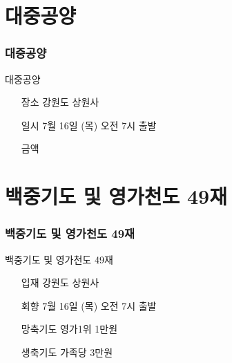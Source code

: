 \documentclass[aspectratio=1610,12pt,xcolor=pdftex,dvipsnames,table,handout]{beamer}
\begin{document}
	

	

		\section{대중공양}
		\begin{frame} [t,plain]
		\frametitle{대중공양}
			\begin{block} {대중공양 }
			\setlength{\leftmargini}{5em}			
			\begin{itemize}
				\item [장소]	 강원도 상원사
				\item [일시]	7월 16일 (목) 오전 7시 출발
				\item [금액]	
			\end{itemize}
			\end{block}						
		\end{frame}					

		\section{백중기도 및 영가천도 49재}
		\begin{frame} [t,plain]
		\frametitle{백중기도 및 영가천도 49재 }
			\begin{block} {백중기도 및 영가천도 49재 }

			\setlength{\leftmargini}{5em}			
			\begin{itemize}
				\item [입재]	 강원도 상원사
				\item [회향]	7월 16일 (목) 오전 7시 출발
				\item [망축기도]	영가1위 1만원
				\item [생축기도]	가족당 3만원
			\end{itemize}

			\end{block}						
		\end{frame}					




\end{document}
